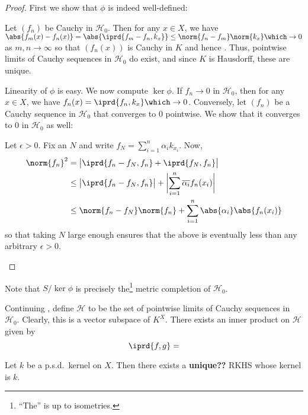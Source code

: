 	\begin{proof}
		First we show that $\phi$ is indeed well-defined:
		\begin{subproof}
			Let $(f_n)$ be Cauchy in $\mathscr H_0$. Then for any $x\in X$, we have $\abs{ f_m(x) - f_n(x) } = \abs{\iprd{f_m - f_n, k_x}}\le \norm{f_n - f_m}\norm{k_x} \which\to 0$ as $m, n\to \infty$ so that $(f_n(x))$ is Cauchy in $K$ and hence \cgt. Thus, pointwise limits of Cauchy sequences in $\mathscr H_0$ do exist, and since $K$ is Hausdorff, these are unique.
		\end{subproof}
		
		Linearity of $\phi$ is easy. We now compute $\ker\phi$. If $f_n\to 0$ in $\mathscr H_0$, then for any $x\in X$, we have $f_n(x) = \iprd{f_n, k_x}\which\to 0$. Conversely, let $(f_n)$ be a Cauchy sequence in $\mathscr H_0$ that converges to $0$ pointwise. We show that it converges to $0$ in $\mathscr H_0$ as well:
		\begin{subproof}
			Let $\epsilon > 0$. Fix an $N$ and write $f_N = \sum_{i = 1}^n \alpha_i k_{x_i}$. Now, 
			\begin{align*}
				\norm{f_n}^2 
				& = \bigl| \iprd{f_n - f_N, f_n} + \iprd{f_N, f_n}\bigr| \\
				& \le \bigl| \iprd{f_n - f_N, f_n} \bigr| + \biggl|\sum_{i = 1}^n \overline{\alpha_i} f_n(x_i)\biggr|\\
				& \le \norm{f_n - f_N}\norm{f_n} + \sum_{i = 1}^n \abs{\alpha_i}\abs{f_n(x_i)}
			\end{align*}
			so that taking $N$ large enough ensures that the above is eventually less than any arbitrary $\epsilon > 0$.\qedhere
		\end{subproof}
	\end{proof}
	
	Note that $S/\ker\phi$ is precisely the\footnote{``The'' is up to isometries.} metric completion of $\mathscr H_0$.
	
	
	
	\vspace{2in}
	
	
	\begin{lem}
		Continuing , define $\mathscr H$ to be the set of pointwise limits of Cauchy sequences in $\mathscr H_0$. Clearly, this is a vector subspace of $K^X$. There exists an inner product on $\mathscr H$ given by
		\[
		\iprd{f, g} = 
		\]
	\end{lem}
	
	
	
	\begin{thm}\label{THM: Moore-Aronszajn}
		Let $k$ be a p.s.d.\ kernel on $X$. Then there exists a \textbf{unique??} RKHS whose kernel is $k$.
	\end{thm}
	
	